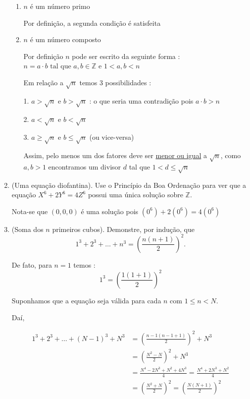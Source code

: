 \documentclass[a4paper,12pt]{article}
\begin{document}
\begin{enumerate}[label=1.\arabic*.]
\begin{enumerate}[label=\Roman*.]
      \item $n$ é um número primo
      
      Por definição, a segunda condição é satisfeita

      \item $n$ é um número composto
    
      Por definição $n$ pode ser escrito da seguinte forma : $n = a \cdot b \text{ tal que } a,b \in \mathbb{Z}$ e
      $1 < a,b < n$ 
      
      Em relação a $\sqrt{n}$ temos 3 possibilidades :

      1. $a > \sqrt{n}$ e $b > \sqrt{n}$ : o que seria uma contradição pois $a \cdot b > n$
      
      2. $a < \sqrt{n}$ e $b < \sqrt{n}$

      3. $a \geq \sqrt{n}$ e $b \leq \sqrt{n}$ (ou vice-versa)

      Assim, pelo menos um dos fatores deve ser \underline{menor ou igual} a $\sqrt{n}$, como $a,b > 1$ encontramos
      um divisor $d$ tal que $1 < d \leq \sqrt{n}$

    \end{enumerate}

    \item (Uma equação diofantina). Use o Princípio da Boa Ordenação para ver que a equação $X^6+2Y^6=4Z^6$ 
    possui uma única solução sobre $\mathbb{Z}$.

    Nota-se que $(0,0,0)$ é uma solução pois $(0^{6}) + 2(0^{6}) = 4(0^{6})$

    \item (Soma dos $n$ primeiros cubos). Demonstre, por indução, que
    \[
      1^3+2^3+\ldots+n^3=\left(\frac{n(n+1)}{2}\right)^2.
    \]

    De fato, para $ n = 1$ temos : 
    \[
      1^{3} = \left(\frac{1(1+1)}{2}\right)^2
    \]

    Suponhamos que a equação seja válida para cada $n$ com $1 \leq n < N$.

    Daí,

    \begin{align*}
      1^3+2^3+\ldots+(N-1)^{3}+N^3 &= \left(\frac{n-1(n-1+1)}{2}\right)^2 + N^3 \\
      &= \left(\frac{N^2 - N}{2}\right)^2 + N^3 \\
      &= \frac{N^4 -2N^3 + N^2 + 4N^3}{4} = \frac{N^4 + 2N^3 + N^2}{4} \\
      &= \left(\frac{N^2 + N}{2}\right)^2= \left(\frac{N(N+1)}{2}\right)^2
    \end{align*}


\end{enumerate}
\end{document}
